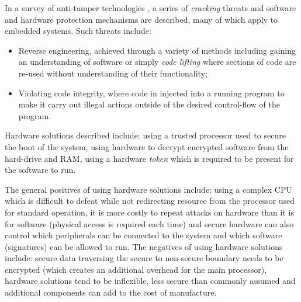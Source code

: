 In a survey of anti-tamper technologies \cite{Bryant2004}, a series of \textit{cracking} threats and software and hardware protection mechanisms are described, many of which apply to embedded systems. Such threats include: 
\begin{itemize}
	\item Reverse engineering, achieved through a variety of methods including gaining an understanding	of software or simply \textit{code lifting} where sections of code are re-used without understanding of their functionality;
	\item Violating code integrity, where code in injected into a running program to make it carry out illegal actions outside of the desired control-flow of the program.
\end{itemize} 
Hardware solutions described include: using a trusted processor used to secure the boot of the system, using hardware to decrypt encrypted software from the hard-drive and RAM, using a hardware \textit{token} which is required to be present for the software to run.

The general positives of using hardware solutions include: using a complex CPU which is difficult to defeat while not redirecting resource from the processor used for standard operation, it is more costly to repeat attacks on hardware than it is for software (physical access is required each time) and secure hardware can also control which peripherals can be connected to the system and which software (signatures) can be allowed to run. The negatives of using hardware solutions include: secure data traversing the secure to non-secure boundary needs to be encrypted (which creates an additional overhead for the main processor), hardware solutions tend to be inflexible, less secure than commonly assumed and additional components can add to the cost of manufacture.


